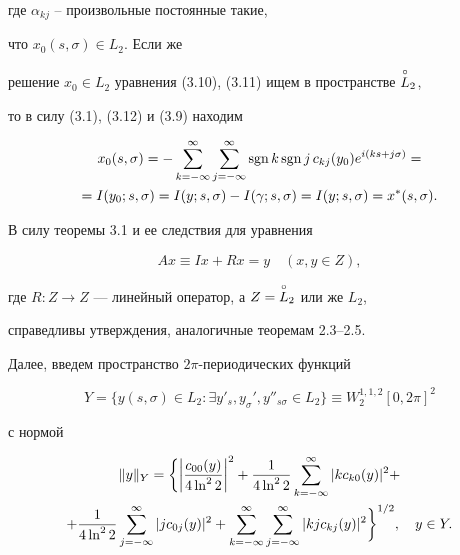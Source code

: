 где $\alpha_{kj}$ -- произвольные постоянные такие, 


что $x_0(s,\sigma)\in L_2$. Если же 


решение $x_0\in L_2$ уравнения (3.10), (3.11) ищем в пространстве $\overset{\circ}{L}{}_2$, 


то в силу (3.1), (3.12) и (3.9) находим 


\begin{multline*}


x_0(s,\sigma) = -\suml_{k=-\infty}^\infty \suml_{j=-\infty}^\infty


\sgn k \sgn j\, c_{kj}(y_0) e^{i(ks+j\sigma)}= \\


%


=I(y_0;s,\sigma) = I(y;s,\sigma)-I(\gamma;s,\sigma) =


I(y;s,\sigma) = x^*(s,\sigma).


\end{multline*}





\begin{notes}


В силу теоремы 3.1 и ее следствия для уравнения 


$$


Ax \equiv Ix + Rx = y\quad  (x,y\in Z),


$$


где $R:Z\to Z$ --- линейный оператор, а $Z=\overset{\circ}{L}{}_2$ или же $L_2$, 


справедливы утверждения, аналогичные теоремам 2.3--2.5. 


\end{notes}





Далее, введем пространство $2\pi$-периодических функций


$$


Y =\{y(s,\sigma)\in L_2:\exists y'_s, y_\sigma', y''_{s\sigma}\in L_2\}


\equiv  W_2^{1,1,2}[0,2\pi]^2


$$


с нормой 


\begin{multline}


\|y\|_Y = \bigg\{\bigg|\frac{c_{00}(y)}{4\ln^2 2}\bigg|^2 +


\frac{1}{4\ln^2 2}\suml_{k=-\infty}^\infty|k c_{k0}(y)|^2+ \\


%


+\frac{1}{4\ln^2 2}\suml_{j=-\infty}^\infty |jc_{0j}(y)|^2 +


\suml_{k=-\infty}^\infty\suml_{j=-\infty}^\infty


|kj c_{kj}(y)|^2\bigg\}^{1/2},\quad y\in Y.


\end{multline}


